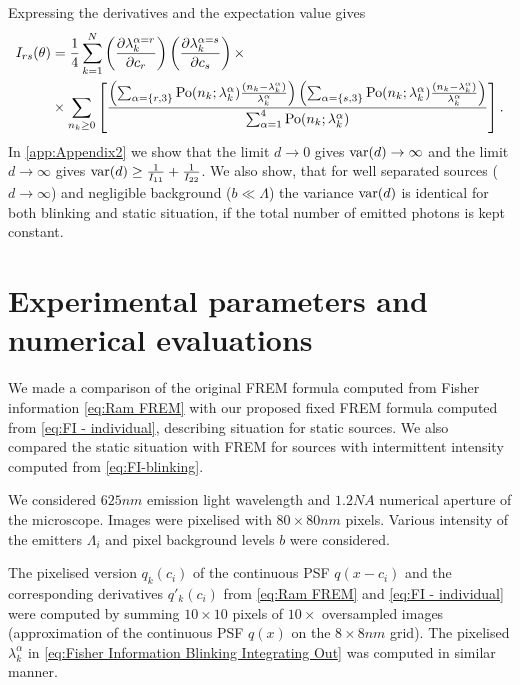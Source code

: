 Expressing the derivatives and the expectation value gives
%
\begin{alignat}{2}
	I_{rs}(\theta)
	&=\frac{1}{4}\sum_{k=1}^N\left(\frac{\partial\lambda_k^{\alpha=r}}{\partial c_r}\right)\left(\frac{\partial\lambda_k^{\alpha=s}}{\partial c_s}\right)\times \nonumber\\
	&\times \sum_{n_k\geq0}\left[\frac{\left(\sum_{\alpha=\{r,3\}}\mathrm{Po}(n_k;\lambda_k^\alpha)\frac{(n_k-\lambda_k^\alpha)}{\lambda_k^\alpha}\right)\left(\sum_{\alpha=\{s,3\}}\mathrm{Po}(n_k;\lambda_k^\alpha)\frac{(n_k-\lambda_k^\alpha)}{\lambda_k^\alpha}\right)}{\sum_{\alpha=1}^4\mathrm{Po}(n_k;\lambda_k^\alpha)}\right].
	\label{eq:FI-blinking}
\end{alignat}
%
In \autoref{app:Appendix2} we show that the limit $d\rightarrow0$ gives $\mathrm{var}(d)\rightarrow\infty$ and the limit $d\rightarrow\infty$ gives $\mathrm{var}(d)\geq\frac{1}{I_{11}}+\frac{1}{I_{22}}$. We also show, that for well separated sources ($d\rightarrow\infty$) and negligible background ($b\ll\Lambda$) the variance $\mathrm{var}(d)$ is identical for both blinking and static situation, if the total number of emitted photons is kept constant. 

\clearpage
\section{Experimental parameters and numerical evaluations\label{sec:FREM simulations}} 
We made a comparison of the original FREM formula computed from Fisher information \autoref{eq:Ram FREM} with our proposed fixed FREM formula computed from \autoref{eq:FI - individual}, describing situation for static sources. We also compared the static situation with FREM for sources with intermittent intensity computed from \autoref{eq:FI-blinking}.

We considered $625\unit{nm}$ emission light wavelength and $1.2\unit{NA}$ numerical aperture of the microscope. Images were pixelised with $80\times80\unit{nm}$ pixels. Various intensity of the emitters $\Lambda_i$ and pixel background levels $b$ were considered.

The pixelised version $q_k(c_i)$ of the continuous PSF $q(x-c_i)$ and the corresponding derivatives $q'_k(c_i)$ from \autoref{eq:Ram FREM} and \autoref{eq:FI - individual} were computed by summing $10\times10$ pixels of $10\times$ oversampled images (approximation of the continuous PSF $q(x)$ on the $8\times8 \unit{nm}$ grid). The pixelised $\lambda^\alpha_k$ in \autoref{eq:Fisher Information Blinking Integrating Out} was computed in similar manner. 


